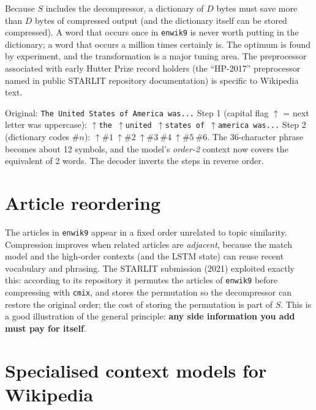 \documentclass[11pt,a4paper,openany]{book}
\newcommand{\code}[1]{\texttt{#1}}
\theoremstyle{definition}
\theoremstyle{remark}
\begin{document}
\begin{keyidea}
Because $S$ includes the decompressor, a dictionary of $D$ bytes must save more than $D$ bytes of compressed output (and the dictionary itself can be stored compressed). A word that occurs once in \code{enwik9} is never worth putting in the dictionary; a word that occurs a million times certainly is. The optimum is found by experiment, and the transformation is a major tuning area. The preprocessor associated with early Hutter Prize record holders (the ``HP-2017'' preprocessor named in public STARLIT repository documentation) is specific to Wikipedia text.
\end{keyidea}

\begin{example}
Original: \texttt{The United States of America was...} Step 1 (capital flag $\uparrow$ = next letter was uppercase): \texttt{$\uparrow$the $\uparrow$united $\uparrow$states of $\uparrow$america was...} Step 2 (dictionary codes $\#n$): \texttt{$\uparrow\#1\ \uparrow\#2\ \uparrow\#3\ \#4\ \uparrow\#5\ \#6$}. The 36-character phrase becomes about 12 symbols, and the model's \emph{order-2} context now covers the equivalent of 2 words. The decoder inverts the steps in reverse order.
\end{example}

\section{Article reordering}

The articles in \code{enwik9} appear in a fixed order unrelated to topic similarity. Compression improves when related articles are \emph{adjacent}, because the match model and the high-order contexts (and the LSTM state) can reuse recent vocabulary and phrasing. The STARLIT submission (2021) exploited exactly this: according to its repository it permutes the articles of \code{enwik9} before compressing with \code{cmix}, and stores the permutation so the decompressor can restore the original order; the cost of storing the permutation is part of $S$. This is a good illustration of the general principle: \textbf{any side information you add must pay for itself}.

\section{Specialised context models for Wikipedia}
\end{document}
